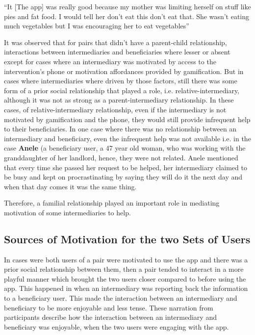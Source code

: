 {``It [The app] was really good because my 
mother was limiting herself on stuff like pies and fat food. I would tell 
her don't eat this don't eat that. She wasn't eating much vegetables but I 
was encouraging her to eat vegetables''}

It was observed that for pairs that didn't have a parent-child relationship, interactions between intermediaries and beneficiaries where lesser or absent except for cases where an intermediary was motivated by access to the intervention's phone or motivation affordances provided by gamification. But in cases where intermediaries where driven by those factors, still there was some form of a prior social relationship that played a role, i.e. relative-intermediary, although it was not as strong as a parent-intermediary relationship. In these cases, of relative-intermediary relationship, even if the intermediary is not motivated by gamification and the phone, they would still provide infrequent help to their beneficiaries.  In one case where there was no relationship between an intermediary and beneficiary, even the infrequent help was not available i.e. in the case \textbf{Anele} (a beneficiary user, a 47 year old woman, who was working with the granddaughter of her landlord, hence, they were not related. Anele mentioned that every time she passed her request to be helped, her intermediary claimed to be busy and kept on procrastinating by saying they will do it the next day and when that day comes it was the same thing. 

Therefore, a familial relationship played an important role in mediating motivation of some intermediaries to help. 
\subsection{Sources of Motivation for the two Sets of Users}
In cases were both users of a pair were motivated to use the app and there was a prior social relationship between them, then a pair tended to interact in a more playful manner which brought the two users closer compared to before using the app. This happened in  when an intermediary was reporting back the information to a beneficiary user.  This made the interaction between an intermediary and beneficiary to be more enjoyable and less tense. These narration from participants describe how the interaction  between an intermediary and beneficiary was enjoyable, when the two users were engaging with the app.


